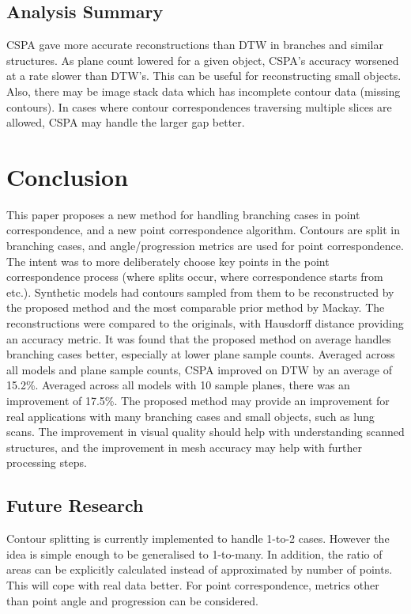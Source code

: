 \documentclass[11p, titlepage]{article}
\begin{document}
\pagebreak

\subsection{Analysis Summary}

CSPA gave more accurate reconstructions than DTW in branches and similar structures. As plane count lowered for a given object, CSPA's accuracy worsened at a rate slower than DTW's. This can be useful for reconstructing small objects. Also, there may be image stack data which has incomplete contour data (missing contours). In cases where contour correspondences traversing multiple slices are allowed, CSPA may handle the larger gap better.

\section{Conclusion}

This paper proposes a new method for handling branching cases in point correspondence, and a new point correspondence algorithm. Contours are split in branching cases, and angle/progression metrics are used for point correspondence. The intent was to more deliberately choose key points in the point correspondence process (where splits occur, where correspondence starts from etc.). Synthetic models had contours sampled from them to be reconstructed by the proposed method and the most comparable prior method by Mackay. The reconstructions were compared to the originals, with Hausdorff distance providing an accuracy metric. It was found that the proposed method on average handles branching cases better, especially at lower plane sample counts. Averaged across all models and plane sample counts, CSPA improved on DTW by an average of 15.2\%. Averaged across all models with 10 sample planes, there was an improvement of 17.5\%. The proposed method may provide an improvement for real applications with many branching cases and small objects, such as lung scans. The improvement in visual quality should help with understanding scanned structures, and the improvement in mesh accuracy may help with further processing steps.

\subsection{Future Research}

Contour splitting is currently implemented to handle 1-to-2 cases. However the idea is simple enough to be generalised to 1-to-many. In addition, the ratio of areas can be explicitly calculated instead of approximated by number of points. This will cope with real data better. For point correspondence, metrics other than point angle and progression can be considered.
\end{document}
